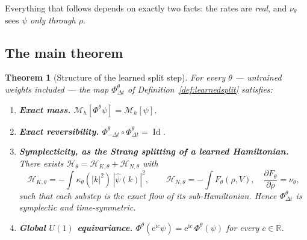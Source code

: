 \documentclass[11pt,a4paper]{article}
\theoremstyle{plain}
\newtheorem{theorem}{Theorem}[section]
\theoremstyle{definition}
\theoremstyle{remark}
\newcommand{\R}{\mathbb{R}}
\newcommand{\iu}{\mathrm{i}}
\newcommand{\eu}{\mathrm{e}}
\newcommand{\dt}{\Delta t}
\newcommand{\Flow}{\Phi}
\newcommand{\Ham}{\mathcal{H}}
\newcommand{\Mass}{\mathcal{M}}
\DeclareMathOperator{\Id}{Id}
\begin{document}
Everything that follows depends on exactly two facts: the rates are \emph{real}, and
$\nu_\theta$ sees $\psi$ \emph{only through $\rho$}.

\subsection{The main theorem}

\begin{theorem}[Structure of the learned split step]
\label{thm:learnedmain}
For every $\theta$ --- untrained weights included --- the map $\Flow^\theta_{\dt}$ of
Definition~\ref{def:learnedsplit} satisfies:
\begin{enumerate}[label=\textup{(\arabic*)},leftmargin=2.2em,itemsep=0.3em]
\item \textbf{Exact mass.} $\Mass_h[\Flow^\theta\psi] = \Mass_h[\psi]$.
\item \textbf{Exact reversibility.} $\Flow^\theta_{-\dt}\circ\Flow^\theta_{\dt} = \Id$.
\item \textbf{Symplecticity, as the Strang splitting of a learned Hamiltonian.} There
exists $\Ham_\theta = \Ham_{K,\theta} + \Ham_{N,\theta}$ with
\[
\Ham_{K,\theta} = -\!\int \kappa_\theta(|k|^2)\,|\widehat\psi(k)|^2,
\qquad
\Ham_{N,\theta} = -\!\int F_\theta(\rho,V),\quad \frac{\partial F_\theta}{\partial\rho}=\nu_\theta,
\]
such that each substep is the \emph{exact} flow of its sub-Hamiltonian. Hence
$\Flow^\theta_{\dt}$ is symplectic and time-symmetric.
\item \textbf{Global $U(1)$ equivariance.}
$\Flow^\theta(\eu^{\iu c}\psi) = \eu^{\iu c}\,\Flow^\theta(\psi)$ for every $c\in\R$.
\end{enumerate}
\end{theorem}
\end{document}
